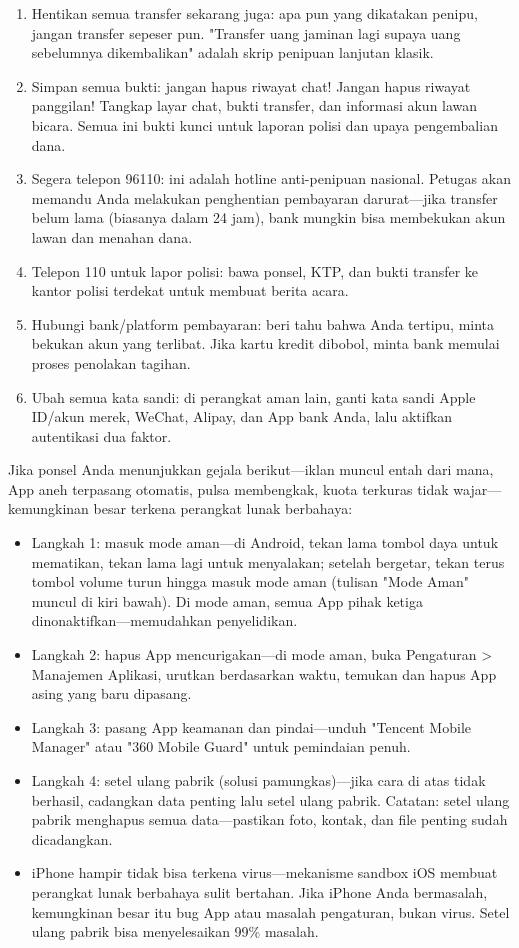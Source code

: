 \begin{enumerate}
  \item Hentikan semua transfer sekarang juga: apa pun yang dikatakan penipu, jangan transfer sepeser pun. "Transfer uang jaminan lagi supaya uang sebelumnya dikembalikan" adalah skrip penipuan lanjutan klasik.
  \item Simpan semua bukti: jangan hapus riwayat chat! Jangan hapus riwayat panggilan! Tangkap layar chat, bukti transfer, dan informasi akun lawan bicara. Semua ini bukti kunci untuk laporan polisi dan upaya pengembalian dana.
  \item Segera telepon 96110: ini adalah hotline anti-penipuan nasional. Petugas akan memandu Anda melakukan penghentian pembayaran darurat—jika transfer belum lama (biasanya dalam 24 jam), bank mungkin bisa membekukan akun lawan dan menahan dana.
  \item Telepon 110 untuk lapor polisi: bawa ponsel, KTP, dan bukti transfer ke kantor polisi terdekat untuk membuat berita acara.
  \item Hubungi bank/platform pembayaran: beri tahu bahwa Anda tertipu, minta bekukan akun yang terlibat. Jika kartu kredit dibobol, minta bank memulai proses penolakan tagihan.
  \item Ubah semua kata sandi: di perangkat aman lain, ganti kata sandi Apple ID/akun merek, WeChat, Alipay, dan App bank Anda, lalu aktifkan autentikasi dua faktor.
\end{enumerate}


Jika ponsel Anda menunjukkan gejala berikut—iklan muncul entah dari mana, App aneh terpasang otomatis, pulsa membengkak, kuota terkuras tidak wajar—kemungkinan besar terkena perangkat lunak berbahaya:

\begin{itemize}
  \item Langkah 1: masuk mode aman—di Android, tekan lama tombol daya untuk mematikan, tekan lama lagi untuk menyalakan; setelah bergetar, tekan terus tombol volume turun hingga masuk mode aman (tulisan "Mode Aman" muncul di kiri bawah). Di mode aman, semua App pihak ketiga dinonaktifkan—memudahkan penyelidikan.
  \item Langkah 2: hapus App mencurigakan—di mode aman, buka Pengaturan > Manajemen Aplikasi, urutkan berdasarkan waktu, temukan dan hapus App asing yang baru dipasang.
  \item Langkah 3: pasang App keamanan dan pindai—unduh "Tencent Mobile Manager" atau "360 Mobile Guard" untuk pemindaian penuh.
  \item Langkah 4: setel ulang pabrik (solusi pamungkas)—jika cara di atas tidak berhasil, cadangkan data penting lalu setel ulang pabrik. Catatan: setel ulang pabrik menghapus semua data—pastikan foto, kontak, dan file penting sudah dicadangkan.
  \item iPhone hampir tidak bisa terkena virus—mekanisme sandbox iOS membuat perangkat lunak berbahaya sulit bertahan. Jika iPhone Anda bermasalah, kemungkinan besar itu bug App atau masalah pengaturan, bukan virus. Setel ulang pabrik bisa menyelesaikan 99\% masalah.
\end{itemize}

